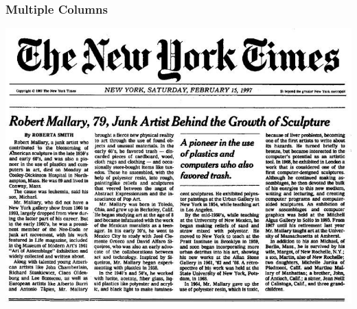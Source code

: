 \begin{frame}
\frametitle{Multiple Columns}
\begin{center}
\includegraphics[width=0.83\linewidth]{images/nytimes_cover}
\end{center}
\end{frame}


